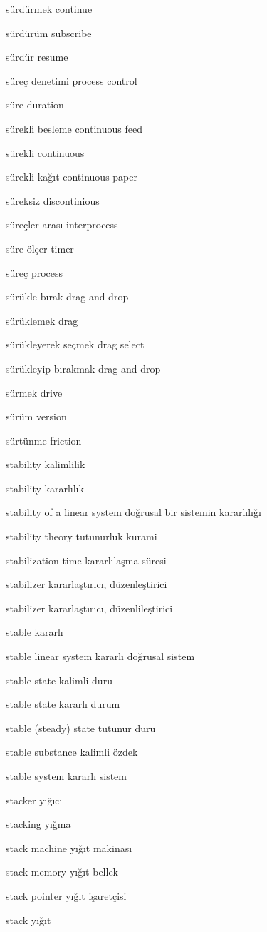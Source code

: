 \documentclass[12pt,fleqn]{article}\usepackage{../../common}
\begin{document}
sürdürmek continue

sürdürüm subscribe

sürdür resume

süreç denetimi process control

süre duration

sürekli besleme continuous feed

sürekli continuous

sürekli kağıt continuous paper

süreksiz discontinious

süreçler arası interprocess

süre ölçer timer

süreç process

sürükle-bırak drag and drop

sürüklemek drag

sürükleyerek seçmek drag select

sürükleyip bırakmak drag and drop

sürmek drive

sürüm version

sürtünme friction

stability kalimlilik

stability kararlılık

stability of a linear system doğrusal bir sistemin kararlılığı

stability theory tutunurluk kurami

stabilization time kararlılaşma süresi

stabilizer kararlaştırıcı, düzenleştirici

stabilizer kararlaştırıcı, düzenlileştirici

stable kararlı

stable linear system kararlı doğrusal sistem

stable state kalimli duru

stable state kararlı durum

stable (steady) state tutunur duru

stable substance kalimli özdek

stable system kararlı sistem

stacker yığıcı

stacking yığma

stack machine yığıt makinası

stack memory yığıt bellek

stack pointer yığıt işaretçisi

stack yığıt
\end{document}
